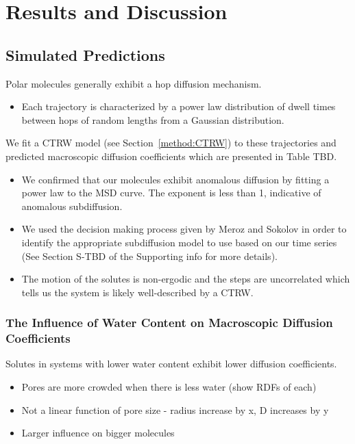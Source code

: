 \documentclass{article}
\begin{document}
  \section{Results and Discussion}

  \subsection{Simulated Predictions}\label{section:D_macro}
 
  Polar molecules generally exhibit a hop diffusion mechanism. 
  \begin{itemize}
	\item Each trajectory is characterized by a power law distribution of
	dwell times between hops of random lengths from a Gaussian distribution.
  \end{itemize}


  We fit a CTRW model (see Section~\ref{method:CTRW}) to these 
  trajectories and predicted macroscopic diffusion coefficients which are
  presented in Table TBD.
  \begin{itemize}
	\item We confirmed that our molecules exhibit anomalous diffusion
	by fitting a power law to the MSD curve. The exponent is less than
	1, indicative of anomalous subdiffusion.
	\item We used the decision making process given by Meroz and Sokolov
	in order to identify the appropriate subdiffusion model to use 
	based on our time series (See Section S-TBD of the Supporting info for
	more details).
	\item The motion of the solutes is non-ergodic and the steps are
	uncorrelated which tells us the system is likely well-described
	by a CTRW. 
  \end{itemize}


  \subsubsection*{The Influence of Water Content on Macroscopic Diffusion Coefficients}

  Solutes in systems with lower water content exhibit lower diffusion coefficients.
  \begin{itemize}
	\item Pores are more crowded when there is less water (show RDFs of each)
	\item Not a linear function of pore size - radius increase by x, D increases by y
	\item Larger influence on bigger molecules
  \end{itemize}
\end{document}
